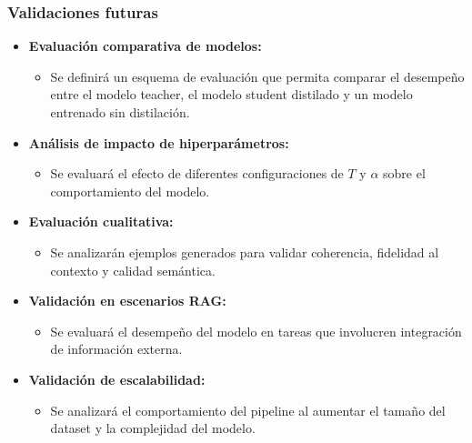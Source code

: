 \documentclass[12pt]{article}
\begin{document}
	\subsubsection{Validaciones futuras}
	
	\begin{itemize}
		\item \textbf{Evaluación comparativa de modelos:}
		\begin{itemize}
			\item Se definirá un esquema de evaluación que permita comparar el desempeño entre el modelo teacher, el modelo student distilado y un modelo entrenado sin distilación.
		\end{itemize}
		
		\item \textbf{Análisis de impacto de hiperparámetros:}
		\begin{itemize}
			\item Se evaluará el efecto de diferentes configuraciones de $T$ y $\alpha$ sobre el comportamiento del modelo.
		\end{itemize}
		
		\item \textbf{Evaluación cualitativa:}
		\begin{itemize}
			\item Se analizarán ejemplos generados para validar coherencia, fidelidad al contexto y calidad semántica.
		\end{itemize}
		
		\item \textbf{Validación en escenarios RAG:}
		\begin{itemize}
			\item Se evaluará el desempeño del modelo en tareas que involucren integración de información externa.
		\end{itemize}
		
		\item \textbf{Validación de escalabilidad:}
		\begin{itemize}
			\item Se analizará el comportamiento del pipeline al aumentar el tamaño del dataset y la complejidad del modelo.
		\end{itemize}
	\end{itemize}
	
\end{document}
